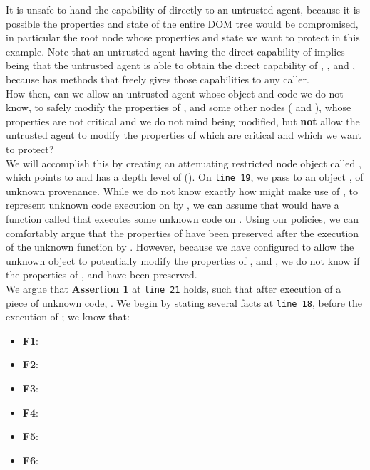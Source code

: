 \documentclass[a4paper,11pt,twoside]{article}
\begin{document}
\vspace{0.5em}
It is unsafe to hand the capability of  directly to an untrusted agent, because it is possible the properties and state of the entire DOM tree would be compromised, in particular the root node  whose properties and state we want to protect in this example. Note that an untrusted agent having the direct capability of  implies being that the untrusted agent is able to obtain the direct capability of , , and , because  has methods that freely gives those capabilities to any caller.\\

 How then, can we allow an untrusted agent whose object and code we do not know, to safely modify the properties of ,  and some other nodes ( and ), whose properties are not critical and we do not mind being modified, but \textbf{not} allow the untrusted agent to modify the properties of  which are critical and which we want to protect?\\

We will accomplish this by creating an attenuating restricted node object called , which points to  and has a depth level of  (). On \texttt{line 19}, we pass  to an object , of unknown provenance. While we do not know exactly how  might make use of , to represent unknown code execution on  by , we can assume that  would have a function called  that executes some unknown code on . Using our policies, we can comfortably argue that the properties of  have been preserved after the execution of the unknown  function by . However, because we have configured  to allow the unknown object to potentially modify the properties of ,  and , we do not know if the properties of ,  and  have been preserved.\\

We argue that \textbf{Assertion 1} at \texttt{line 21} holds, such that after execution of a piece of unknown code, .
We begin by stating several facts at \texttt{line 18}, before the execution of ; we know that:
\begin{itemize}
\item \textbf{F1}: 
\item \textbf{F2}: 
\item \textbf{F3}: 
\item \textbf{F4}: 
\item \textbf{F5}: 
\item \textbf{F6}: 
\end{itemize}
\end{document}
